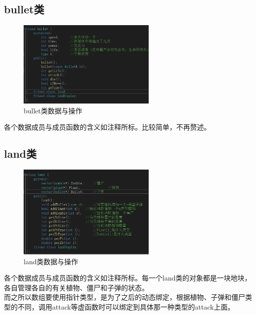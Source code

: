 \documentclass[12pt,a4paper,UTF8]{article}
\begin{document}
    \subsection{bullet类}
    \begin{figure}[H]
      \centering
    \includegraphics[width=0.6\textwidth]{figure/bullet.png}
    \caption{bullet类数据与操作}
    \end{figure}
    各个数据成员与成员函数的含义如注释所标。比较简单，不再赘述。

    \subsection{land类}
      \begin{figure}[H]
        \centering
      \includegraphics[width=0.6\textwidth]{figure/land.png}
      \caption{land类数据与操作}
      \end{figure}
      各个数据成员与成员函数的含义如注释所标。每一个land类的对象都是一块地块，各自管理各自的有关植物、僵尸和子弹的状态。\\
      而之所以数组要使用指针类型，是为了之后的动态绑定，根据植物、子弹和僵尸类型的不同，调用attack等虚函数时可以绑定到具体那一种类型的attack上面。
\end{document}
